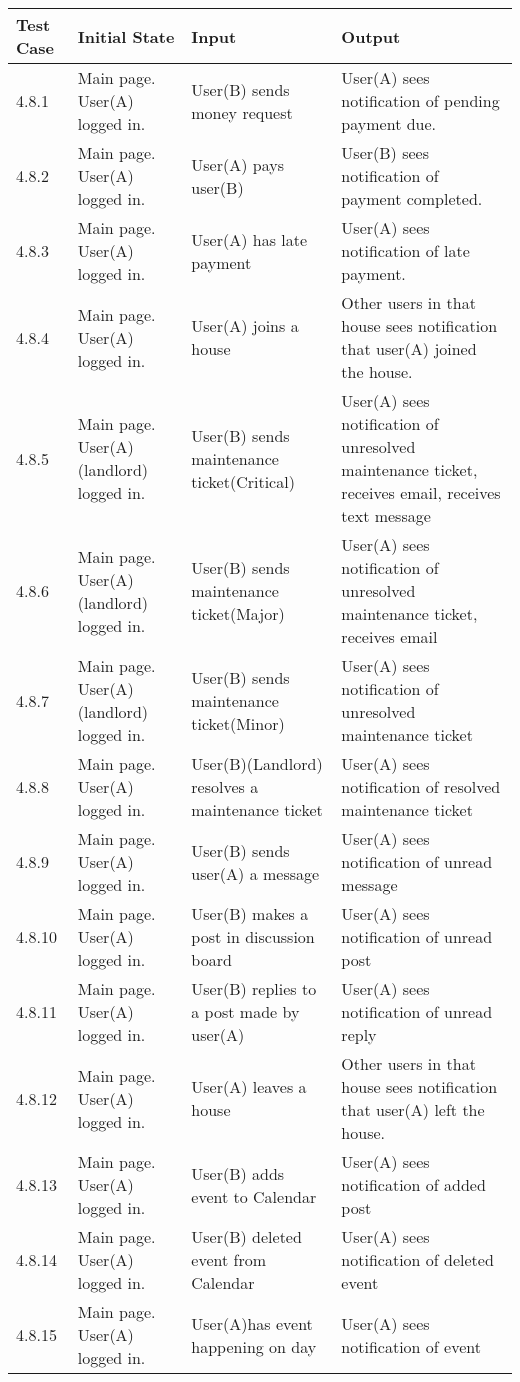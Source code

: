 \documentclass[12pt]{article}
\begin{document}
\begin{longtable}{|p{2cm}|p{3cm}|p{5cm}|p{5cm}|}
\hline
\textbf{Test Case}  & \textbf{Initial State} & \textbf{Input} & \textbf{Output} \\ \hline
4.8.1 & Main page. User(A) logged in. & User(B) sends money request & User(A) sees notification of pending payment due.  \\ 
\hline
4.8.2 & Main page. User(A) logged in. & User(A) pays user(B) & User(B) sees notification of payment completed.  \\ 
\hline
4.8.3 & Main page. User(A) logged in. & User(A) has late payment & User(A) sees notification of late payment.  \\ 
\hline
4.8.4 & Main page. User(A) logged in. & User(A) joins a house  & Other users in that house sees notification that user(A) joined the house. \\
\hline
4.8.5 & Main page. User(A)(landlord) logged in. & User(B) sends maintenance ticket(Critical) & User(A) sees notification of unresolved maintenance ticket, receives email, receives text message \\
\hline
4.8.6 & Main page. User(A)(landlord) logged in. & User(B) sends maintenance ticket(Major) & User(A) sees notification of unresolved maintenance ticket, receives email\\
\hline
4.8.7 & Main page. User(A)(landlord) logged in. & User(B) sends maintenance ticket(Minor) & User(A) sees notification of unresolved maintenance ticket \\
\hline
4.8.8 & Main page. User(A) logged in. & User(B)(Landlord) resolves a maintenance ticket & User(A) sees notification of resolved maintenance ticket \\
\hline
4.8.9 & Main page. User(A) logged in. & User(B) sends user(A) a message & User(A) sees notification of unread message \\
\hline
4.8.10 & Main page. User(A) logged in. & User(B) makes a post in discussion board & User(A) sees notification of unread post \\
\hline
4.8.11 & Main page. User(A) logged in. & User(B) replies to a post made by user(A) & User(A) sees notification of unread reply \\
\hline
4.8.12 & Main page. User(A) logged in. & User(A) leaves a house  & Other users in that house sees notification that user(A) left the house. \\
\hline
4.8.13 & Main page. User(A) logged in. & User(B) adds event to Calendar & User(A) sees notification of added post \\
\hline
4.8.14 & Main page. User(A) logged in. & User(B) deleted event from Calendar & User(A) sees notification of deleted event \\
\hline
4.8.15 & Main page. User(A) logged in. & User(A)has event happening on day & User(A) sees notification of event \\
\hline
\end{longtable}
\end{document}
